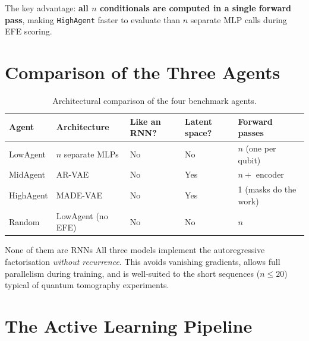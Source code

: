 \documentclass[11pt, a4paper]{article}
\begin{document}
The key advantage: \textbf{all $n$ conditionals are computed in a single
forward pass}, making \texttt{HighAgent} faster to evaluate than
$n$ separate MLP calls during EFE scoring.

\section{Comparison of the Three Agents}

\begin{table}[h]
\centering
\renewcommand{\arraystretch}{1.4}
\begin{tabular}{lllll}
\toprule
\textbf{Agent} & \textbf{Architecture} & \textbf{Like an RNN?} &
\textbf{Latent space?} & \textbf{Forward passes} \\
\midrule
LowAgent  & $n$ separate MLPs     & No  & No  & $n$ (one per qubit)   \\
MidAgent  & AR-VAE                & No  & Yes & $n + $ encoder        \\
HighAgent & MADE-VAE              & No  & Yes & 1 (masks do the work) \\
Random    & LowAgent (no EFE)     & No  & No  & $n$                   \\
\bottomrule
\end{tabular}
\caption{Architectural comparison of the four benchmark agents.}
\end{table}

\begin{keybox}{None of them are RNNs}
All three models implement the autoregressive factorisation
\emph{without recurrence}. This avoids vanishing gradients, allows
full parallelism during training, and is well-suited to the short
sequences ($n \leq 20$) typical of quantum tomography experiments.
\end{keybox}

\section{The Active Learning Pipeline}
\end{document}
